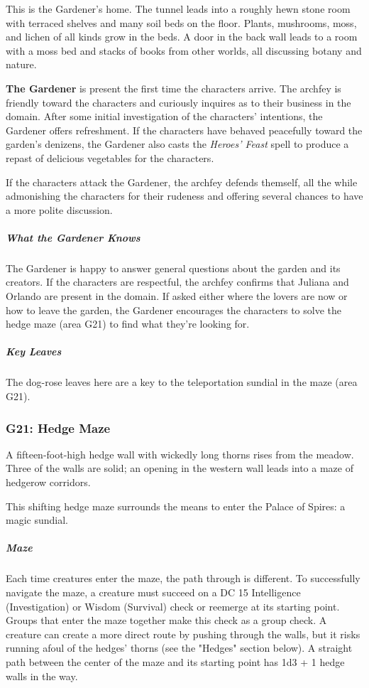 \documentclass[10pt,a4paper,twoside,bg=print,twocolumn,openany,nodeprecatedcode]{dndbook}
\begin{document}
This is the Gardener's home. The tunnel leads into a roughly hewn stone room with terraced shelves and many soil beds on the floor. Plants, mushrooms, moss, and lichen of all kinds grow in the beds. A door in the back wall leads to a room with a moss bed and stacks of books from other worlds, all discussing botany and nature.

\textbf{The Gardener} is present the first time the characters arrive. The archfey is friendly toward the characters and curiously inquires as to their business in the domain. After some initial investigation of the characters' intentions, the Gardener offers refreshment. If the characters have behaved peacefully toward the garden's denizens, the Gardener also casts the \textit{Heroes' Feast} spell to produce a repast of delicious vegetables for the characters.

If the characters attack the Gardener, the archfey defends themself, all the while admonishing the characters for their rudeness and offering several chances to have a more polite discussion.

\subparagraph{What the Gardener Knows}
The Gardener is happy to answer general questions about the garden and its creators. If the characters are respectful, the archfey confirms that Juliana and Orlando are present in the domain. If asked either where the lovers are now or how to leave the garden, the Gardener encourages the characters to solve the hedge maze (area G21) to find what they're looking for.

\subparagraph{Key Leaves}
The dog-rose leaves here are a key to the teleportation sundial in the maze (area G21).

\subsubsection{G21: Hedge Maze}
\begin{DndReadAloud}{}
A fifteen-foot-high hedge wall with wickedly long thorns rises from the meadow. Three of the walls are solid; an opening in the western wall leads into a maze of hedgerow corridors.

\end{DndReadAloud}

This shifting hedge maze surrounds the means to enter the Palace of Spires: a magic sundial.

\subparagraph{Maze}
Each time creatures enter the maze, the path through is different. To successfully navigate the maze, a creature must succeed on a DC 15 Intelligence (Investigation) or Wisdom (Survival) check or reemerge at its starting point. Groups that enter the maze together make this check as a group check. A creature can create a more direct route by pushing through the walls, but it risks running afoul of the hedges' thorns (see the "Hedges" section below). A straight path between the center of the maze and its starting point has 1d3 + 1 hedge walls in the way.
\end{document}
